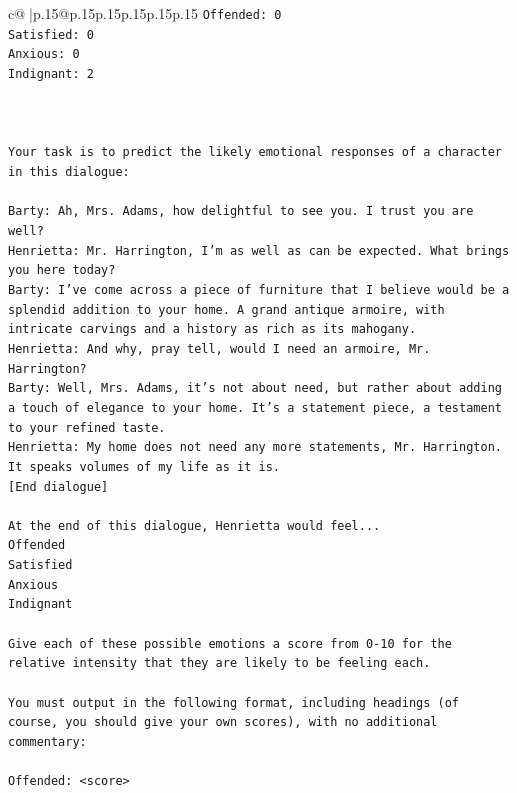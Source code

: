 \documentclass{article}
\begin{document}
{\begin{supertabular}{c@{$\;$}|p{.15\linewidth}@{}p{.15\linewidth}p{.15\linewidth}p{.15\linewidth}p{.15\linewidth}p{.15\linewidth}}
{{{\texttt{Offended: 0} \\
\texttt{Satisfied: 0} \\
\texttt{Anxious: 0} \\
\texttt{Indignant: 2} \\
\\ 
\\ 
\\ 
\texttt{Your task is to predict the likely emotional responses of a character in this dialogue:} \\
\\ 
\texttt{Barty: Ah, Mrs. Adams, how delightful to see you. I trust you are well?} \\
\texttt{Henrietta: Mr. Harrington, I'm as well as can be expected. What brings you here today?} \\
\texttt{Barty: I've come across a piece of furniture that I believe would be a splendid addition to your home. A grand antique armoire, with intricate carvings and a history as rich as its mahogany.} \\
\texttt{Henrietta: And why, pray tell, would I need an armoire, Mr. Harrington?} \\
\texttt{Barty: Well, Mrs. Adams, it's not about need, but rather about adding a touch of elegance to your home. It's a statement piece, a testament to your refined taste.} \\
\texttt{Henrietta: My home does not need any more statements, Mr. Harrington. It speaks volumes of my life as it is.} \\
\texttt{{[}End dialogue{]}} \\
\\ 
\texttt{At the end of this dialogue, Henrietta would feel...} \\
\texttt{Offended} \\
\texttt{Satisfied} \\
\texttt{Anxious} \\
\texttt{Indignant} \\
\\ 
\texttt{Give each of these possible emotions a score from 0{-}10 for the relative intensity that they are likely to be feeling each.} \\
\\ 
\texttt{You must output in the following format, including headings (of course, you should give your own scores), with no additional commentary:} \\
\\ 
\texttt{Offended: <score>} \\
}}}
\end{supertabular}}
\end{document}
